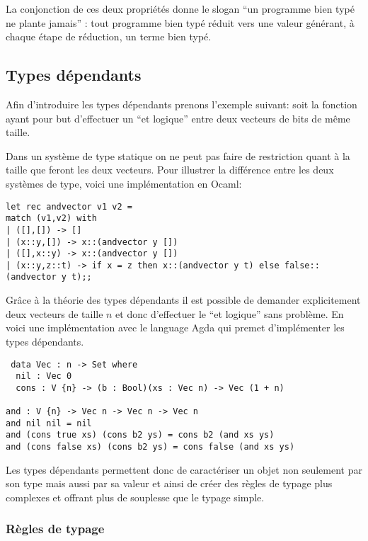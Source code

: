 \documentclass{article}
\theoremstyle{definition}
\theoremstyle{remark}
\begin{document}
La conjonction de ces deux propriétés donne le slogan ``un programme
bien typé ne plante jamais''\citep{milner:no-wrong} : tout programme
bien typé réduit vers une valeur générant, à chaque étape de
réduction, un terme bien typé.


\subsection{Types dépendants}

Afin d'introduire les types dépendants prenons l'exemple suivant: soit
la fonction ayant pour but d'effectuer un ``et logique'' entre deux
vecteurs de bits de même taille.

Dans un système de type statique on ne peut pas faire de restriction
quant à la taille que feront les deux vecteurs.  
Pour illustrer la différence entre les deux systèmes de type, voici une 
implémentation en Ocaml:

\begin{verbatim}
let rec andvector v1 v2 = 
match (v1,v2) with 
| ([],[]) -> []
| (x::y,[]) -> x::(andvector y [])
| ([],x::y) -> x::(andvector y [])
| (x::y,z::t) -> if x = z then x::(andvector y t) else false::(andvector y t);;
\end{verbatim}

Grâce à la théorie des types dépendants il est possible de demander
explicitement deux vecteurs de taille \(n\) et donc d'effectuer le
``et logique'' sans problème. 
En voici une implémentation avec le language Agda qui premet d'implémenter 
les types dépendants.

\begin{verbatim}
 data Vec : n -> Set where
  nil : Vec 0
  cons : V {n} -> (b : Bool)(xs : Vec n) -> Vec (1 + n)

and : V {n} -> Vec n -> Vec n -> Vec n
and nil nil = nil
and (cons true xs) (cons b2 ys) = cons b2 (and xs ys)
and (cons false xs) (cons b2 ys) = cons false (and xs ys)
\end{verbatim}


Les types dépendants permettent donc de caractériser un objet non
seulement par son type mais aussi par sa valeur et ainsi de créer des
règles de typage plus complexes et offrant plus de souplesse que le
typage simple.

\subsubsection{Règles de typage}
\end{document}
